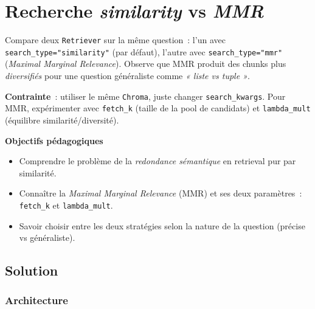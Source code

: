 \documentclass[11pt,a4paper]{article}
\begin{document}
\section{Recherche \emph{similarity} vs \emph{MMR}}

\begin{tcolorbox}[title=Exercice 5. Comparer deux stratégies de retrieval]
Compare deux \texttt{Retriever} sur la même question~: l'un avec
\texttt{search\_type="similarity"} (par défaut), l'autre avec
\texttt{search\_type="mmr"} (\emph{Maximal Marginal Relevance}).
Observe que MMR produit des chunks plus \emph{diversifiés} pour une
question généraliste comme \emph{« liste vs tuple »}.

\textbf{Contrainte}~: utiliser le même \texttt{Chroma}, juste changer
\texttt{search\_kwargs}. Pour MMR, expérimenter avec \texttt{fetch\_k}
(taille de la pool de candidats) et \texttt{lambda\_mult} (équilibre
similarité/diversité).

\bigskip
\noindent\textbf{Objectifs pédagogiques}
\begin{itemize}[leftmargin=*]
  \item Comprendre le problème de la \emph{redondance sémantique} en
        retrieval pur par similarité.
  \item Connaître la \emph{Maximal Marginal Relevance} (MMR) et ses
        deux paramètres~: \texttt{fetch\_k} et \texttt{lambda\_mult}.
  \item Savoir choisir entre les deux stratégies selon la nature de la
        question (précise vs généraliste).
\end{itemize}
\end{tcolorbox}

\subsection{Solution}

\subsubsection{Architecture}
\end{document}
